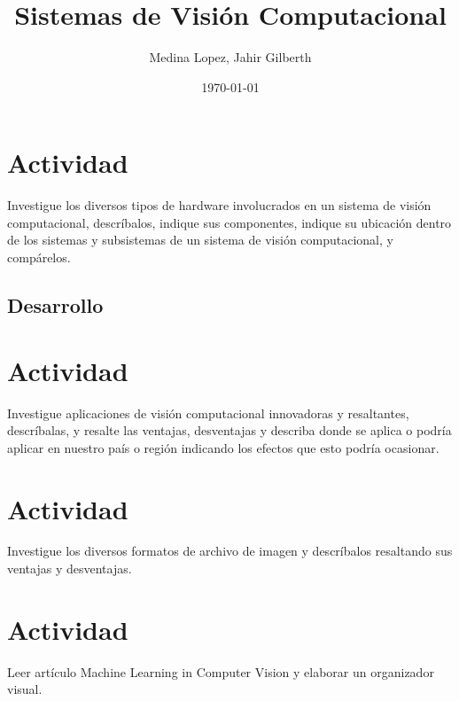 \documentclass[12pt,a4paper]{article}
\title{Sistemas de Visi\'on Computacional}
\author{Medina Lopez, Jahir Gilberth}
\date{\today}
\begin{document}
\maketitle

\section{Actividad}

Investigue los diversos tipos de hardware involucrados en un sistema de visi\'on computacional, 
descr\'ibalos, indique sus componentes, indique su ubicaci\'on dentro de los sistemas y subsistemas
de un sistema de visi\'on computacional, y comp\'arelos.

\subsection{Desarrollo}

\section{Actividad}

Investigue aplicaciones de visi\'on computacional innovadoras y resaltantes, descr\'ibalas, y 
resalte las ventajas, desventajas y describa donde se aplica o podr\'ia aplicar en nuestro pa\'is 
o regi\'on indicando los efectos que esto podr\'ia ocasionar.

\section{Actividad}

Investigue los diversos formatos de archivo de imagen y descr\'ibalos resaltando sus ventajas y 
desventajas.


\section{Actividad}

Leer art\'iculo Machine Learning in Computer Vision y elaborar un organizador visual.
\end{document}
